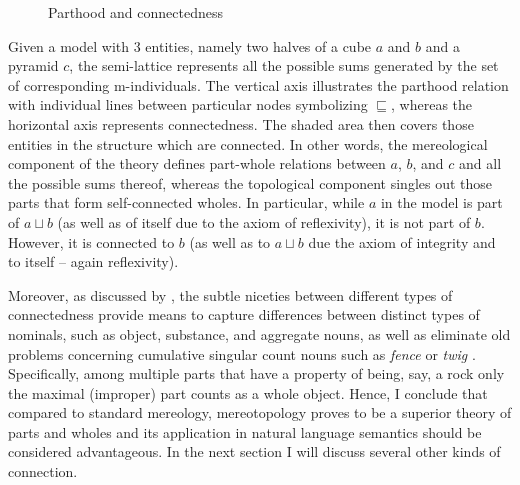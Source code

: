     \begin{figure}[h!]
\centering
{}
\caption{Parthood and connectedness \citep[based on][p. 136]{grimm2012number}}
\label{fig:parthood-and-connectedness}
\end{figure}

Given a model with 3 entities, namely two halves of a cube $a$ and $b$ and a pyramid $c$, the semi-lattice represents all the possible sums generated by the set of corresponding m-individuals. The vertical axis illustrates the parthood relation with individual lines between particular nodes symbolizing $\sqsubseteq$, whereas the horizontal axis represents connectedness. The shaded area then covers those entities in the structure which are connected. In other words, the mereological component of the theory defines part-whole relations between $a$, $b$, and $c$ and all the possible sums thereof, whereas the topological component singles out those parts that form self-connected wholes. In particular, while $a$ in the model is part of $a \sqcup b$ (as well as of itself due to the axiom of reflexivity), it is not part of $b$. However, it is connected to $b$ (as well as to $a \sqcup b$ due the axiom of integrity and to itself -- again reflexivity).
   
    Moreover, as discussed by \citet{grimm2012number}, the subtle niceties between different types of connectedness provide means to capture differences between distinct types of nominals, such as object, substance, and aggregate nouns, as well as eliminate old problems concerning cumulative singular count nouns such as \textit{fence} or \textit{twig} \citep[see, e.g.,][]{zucchi_white2001twigs,rothstein2010counting}. Specifically, among multiple parts that have a property of being, say, a rock only the maximal (improper) part counts as a whole object. Hence, I conclude that compared to standard mereology, mereotopology proves to be a superior theory of parts and wholes and its application in natural language semantics should be considered advantageous. In the next section I will discuss several other kinds of connection. 

